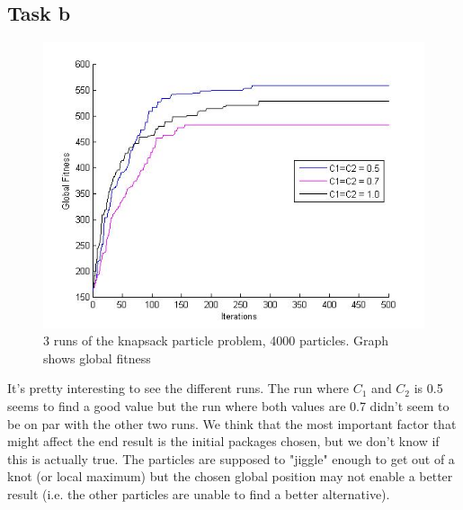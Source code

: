 \documentclass[12pt, a4paper]{article}
\begin{document}
\subsection{Task b}
\begin{figure}[H]
\begin{center}
\includegraphics[width=\linewidth]{KnapSack_noInertia}
\caption{3 runs of the knapsack particle problem, 4000 particles. Graph shows global fitness}
\end{center}

\end{figure}
It's pretty interesting to see the different runs. The run where $C_1$ and $C_2$ is 0.5 seems to find a good value but the run where both values are 0.7 didn't seem to be on par with the other two runs. We think that the most important factor that might affect the end result is the initial packages chosen, but we don't know if this is actually true. The particles are supposed to "jiggle" enough to get out of a knot (or local maximum) but the chosen global position may not enable a better result (i.e. the other particles are unable to find a better alternative).
\end{document}

